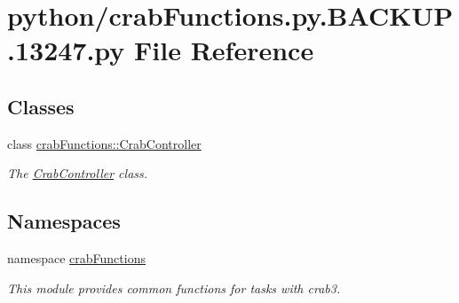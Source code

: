 \section{python/crabFunctions.py.BACKUP.13247.py File Reference}
\label{crabFunctions_8py_8BACKUP_813247_8py}
\subsection*{Classes}
\begin{DoxyCompactItemize}
\item 
class \hyperlink{classcrabFunctions_1_1CrabController}{crabFunctions::CrabController}
\begin{DoxyCompactList}\small\item\em The \hyperlink{classcrabFunctions_1_1CrabController}{CrabController} class. \item\end{DoxyCompactList}\end{DoxyCompactItemize}
\subsection*{Namespaces}
\begin{DoxyCompactItemize}
\item 
namespace \hyperlink{namespacecrabFunctions}{crabFunctions}


\begin{DoxyCompactList}\small\item\em This module provides common functions for tasks with crab3. \item\end{DoxyCompactList}\end{DoxyCompactItemize}
